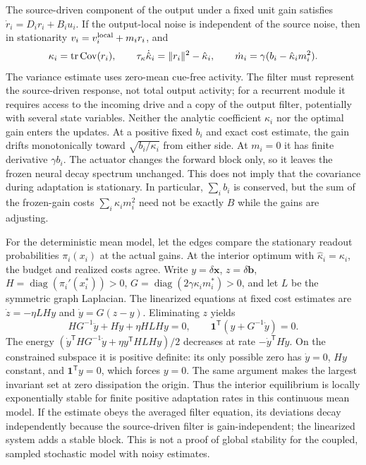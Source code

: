 The source-driven component of the output under a fixed unit
gain satisfies \(\dot r_i=D_i r_i+B_i u_i\).
If the output-local noise is independent of the source noise,
then in stationarity \(v_i=v_i^{\rm local}+m_i r_i\), and
\begin{equation}
 \kappa_i=\operatorname{tr}\operatorname{Cov}(r_i),\qquad
 \tau_\kappa\dot{\hat\kappa}_i=\|r_i\|^2-\hat\kappa_i,
 \qquad
 \dot m_i=\gamma(b_i-\hat\kappa_i m_i^2).
 \label{eq:gainhomeostasis}
\end{equation}
The variance estimate uses zero-mean cue-free activity. The filter
must represent the source-driven response, not total output activity;
for a recurrent module it requires access to the incoming drive and
a copy of the output filter, potentially with several state variables.
Neither the analytic coefficient \(\kappa_i\) nor the optimal gain
enters the updates. At a positive fixed \(b_i\) and exact cost
estimate, the gain drifts monotonically toward
\(\sqrt{b_i/\kappa_i}\) from either side. At \(m_i=0\) it has finite
derivative \(\gamma b_i\). The actuator changes the forward block
only, so it leaves the frozen neural decay spectrum unchanged.
This does not imply that the covariance during adaptation is
stationary. In particular, \(\sum_i b_i\) is conserved, but the sum
of the frozen-gain costs \(\sum_i\kappa_i m_i^2\) need not be
exactly \(B\) while the gains are adjusting.

For the deterministic mean model, let the edges compare the
stationary readout probabilities \(\pi_i(x_i)\) at the actual gains.
At the interior optimum with
\(\hat\kappa_i=\kappa_i\), the budget and realized costs agree.
Write \(y=\delta\boldsymbol x\), \(z=\delta\boldsymbol b\),
\(H=\operatorname{diag}(\pi_i'(x_i^*))>0\),
\(G=\operatorname{diag}(2\gamma\kappa_i m_i^*)>0\), and let
\(L\) be the symmetric graph Laplacian. The linearized equations
at fixed cost estimates are \(\dot z=-\eta LH y\) and
\(\dot y=G(z-y)\). Eliminating \(z\) yields
\begin{equation}
 HG^{-1}\ddot y+H\dot y+\eta HLHy=0,
 \qquad \mathbf{1}^{\mathsf T}(y+G^{-1}\dot y)=0 .
\end{equation}
The energy \((\dot y^{\mathsf T}HG^{-1}\dot y+
\eta y^{\mathsf T}HLHy)/2\) decreases at rate
\(-\dot y^{\mathsf T}H\dot y\). On the constrained subspace it is
positive definite: its only possible zero has \(\dot y=0\),
\(Hy\) constant, and \(\mathbf{1}^{\mathsf T}y=0\), which forces
\(y=0\). The same argument makes the largest invariant set at
zero dissipation the origin. Thus the interior equilibrium is
locally exponentially stable for finite positive adaptation rates in
this continuous mean model. If the estimate obeys the averaged
filter equation, its deviations decay independently because the
source-driven filter is gain-independent; the linearized system
adds a stable block. This is not a proof of global stability for
the coupled, sampled stochastic model with noisy estimates.

